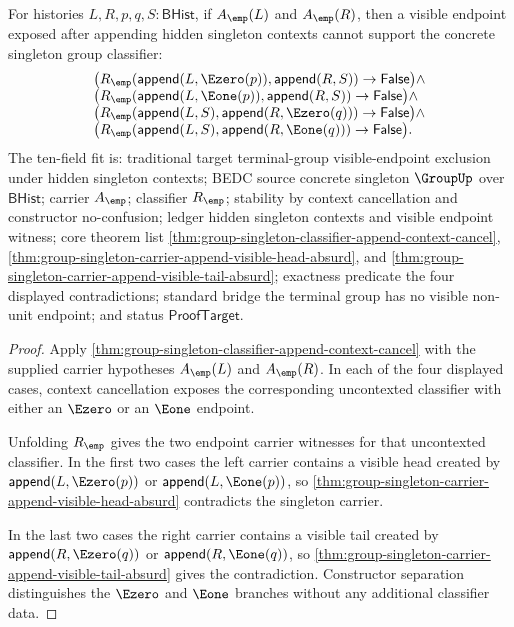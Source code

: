 \begin{theorem}
\label{thm:group-singleton-classifier-append-context-visible-middle-absurd}
For histories $L,R,p,q,S:\mathsf{BHist}$, if $A_{\emp}(L)$ and
$A_{\emp}(R)$, then a visible endpoint exposed after appending hidden
singleton contexts cannot support the concrete singleton group classifier:
$$
\begin{array}{l}
\bigl(R_{\emp}(\mathsf{append}(L,\Ezero(p)),\mathsf{append}(R,S))
\to \mathsf{False}\bigr)\land\\
\bigl(R_{\emp}(\mathsf{append}(L,\Eone(p)),\mathsf{append}(R,S))
\to \mathsf{False}\bigr)\land\\
\bigl(R_{\emp}(\mathsf{append}(L,S),\mathsf{append}(R,\Ezero(q)))
\to \mathsf{False}\bigr)\land\\
\bigl(R_{\emp}(\mathsf{append}(L,S),\mathsf{append}(R,\Eone(q)))
\to \mathsf{False}\bigr).
\end{array}
$$
The ten-field fit is: traditional target terminal-group visible-endpoint
exclusion under hidden singleton contexts; BEDC source concrete singleton
$\GroupUp$ over $\mathsf{BHist}$; carrier $A_{\emp}$; classifier $R_{\emp}$;
stability by context cancellation and constructor no-confusion; ledger hidden
singleton contexts and visible endpoint witness; core theorem list
\autoref{thm:group-singleton-classifier-append-context-cancel},
\autoref{thm:group-singleton-carrier-append-visible-head-absurd}, and
\autoref{thm:group-singleton-carrier-append-visible-tail-absurd}; exactness
predicate the four displayed contradictions; standard bridge the terminal
group has no visible non-unit endpoint; and status $\mathsf{ProofTarget}$.
\end{theorem}
\begin{proof}
Apply \autoref{thm:group-singleton-classifier-append-context-cancel} with the
supplied carrier hypotheses $A_{\emp}(L)$ and $A_{\emp}(R)$. In each of the
four displayed cases, context cancellation exposes the corresponding
uncontexted classifier with either an $\Ezero$ or an $\Eone$ endpoint.

Unfolding $R_{\emp}$ gives the two endpoint carrier witnesses for that
uncontexted classifier. In the first two cases the left carrier contains a
visible head created by $\mathsf{append}(L,\Ezero(p))$ or
$\mathsf{append}(L,\Eone(p))$, so
\autoref{thm:group-singleton-carrier-append-visible-head-absurd} contradicts
the singleton carrier.

In the last two cases the right carrier contains a visible tail created by
$\mathsf{append}(R,\Ezero(q))$ or $\mathsf{append}(R,\Eone(q))$, so
\autoref{thm:group-singleton-carrier-append-visible-tail-absurd} gives the
contradiction. Constructor separation distinguishes the $\Ezero$ and $\Eone$
branches without any additional classifier data.
\end{proof}


